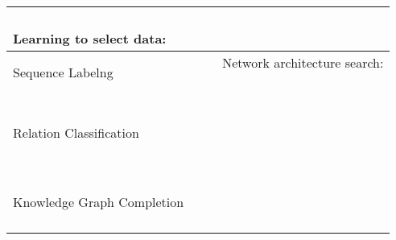 \begin{table*}[tb!]
{\begin{tabular}{|l||l|l|l|}
{                            \cite{learningToOptimize:metaNLP21}         \\
                          Learning to select data:                      \\
                            \cite{label-correction-aaai21}}
        \\ \hline
        Sequence Labelng
          & \tabincell{l}{\cite{Wu:AAAI20}                              \\
                          \cite{xia-etal-2021-metaxl}}
          & \tabincell{l}{\cite{Hou:ACL20}                              \\
                          \cite{yang2020frustratingly}                  \\
                          \cite{oguz2021few}}
          & \tabincell{l}{Network architecture search:                  \\
                            \cite{li2020learning}                       \\
                            \cite{jiang2019improved}}
        \\ \hline
        Relation Classification
          & \tabincell{l}{\cite{Obamuyide:ACL19}                        \\
                          \cite{Bose:arXiv19}                           \\
                          \cite{Lv:EMNLP19}}
          & \tabincell{l}{\cite{Ye:ACL19}                               \\
                          \cite{Chen:EMNLP19}                           \\
                          \cite{Xiong:EMNLP18}                          \\
                          \cite{Gao:AAAI19}                             \\
                          \cite{ren2020two}}
          &
        \\ \hline
        Knowledge Graph Completion
          &
          & \tabincell{l}{\cite{xiong2018one}                           \\
                          \cite{wang2019tackling}                       \\
                          \cite{zhang2020few}                           \\
}
\end{tabular}}
\end{table*}
